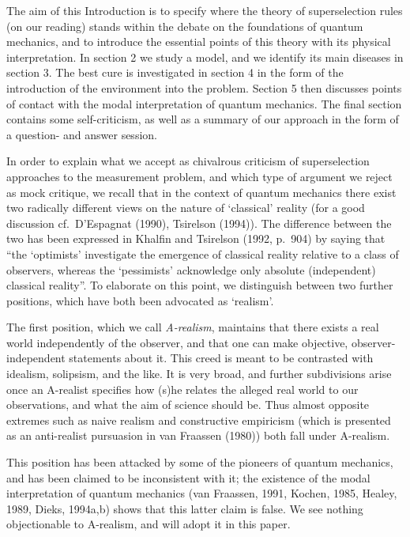 The aim of this Introduction is to specify where the theory of superselection
rules (on our reading)
stands within the debate on the foundations of quantum mechanics, and to
introduce the essential
points of this theory with its physical interpretation. In section 2 we study a
model, and we
identify its main diseases in section 3. The best cure
is
investigated in section 4 in the form of the introduction of the environment
into the problem.
Section 5 then discusses points of contact with the modal interpretation of
quantum mechanics.
The final section contains some self-criticism, as well as a summary of our
approach in the form of
a question- and answer session.

In order to explain what we accept as chivalrous criticism of superselection
approaches to the
measurement problem, and which type of argument we reject as mock critique, we
recall that in the
context of quantum mechanics there exist two radically different views on the
nature of `classical'
reality (for a good discussion cf.\ D'Espagnat (1990), Tsirelson (1994)). The
difference between the
two has been expressed in Khalfin and Tsirelson (1992, p.\ 904) by saying that
``the
`optimists' investigate the emergence of classical reality relative to a class
of observers, whereas
the `pessimists' acknowledge only absolute (independent) classical reality''.
To elaborate on this
point, we  distinguish between two further positions, which have both been
advocated as `realism'.

 The first position, which we call {\em A-realism},
maintains that there exists a real world independently of the observer, and
that one can make
objective, observer-independent statements about it. This creed is meant to be
contrasted with
idealism, solipsism, and the like. It is very broad, and further subdivisions
arise once an
A-realist specifies how (s)he relates the alleged real world to our
observations, and what the aim
of science should be. Thus almost opposite extremes such as naive realism and
constructive empiricism
(which is presented as an anti-realist pursuasion  in van Fraassen (1980)) both
fall under
A-realism.

 This position has been attacked by some of the pioneers of quantum
mechanics, and has been claimed to be inconsistent with it;  the existence of
the modal interpretation
of quantum mechanics  (van Fraassen, 1991, Kochen, 1985, Healey, 1989, Dieks,
1994a,b) shows that this
 latter claim is false. We see nothing objectionable to A-realism, and  will
adopt it in this paper.


